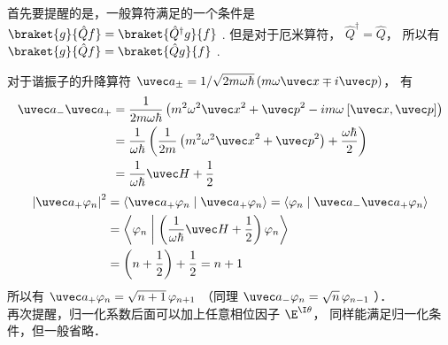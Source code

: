 
首先要提醒的是，一般算符满足的一个条件是 $\braket{g}{\hat Q f}=\braket{\hat Q^\dagger g}{ f}$ . 但是对于厄米算符， ${\hat Q^\dagger } = \hat Q$，  所以有 $\braket{g}{\hat Q f} = \braket{\hat Q g}{f}$ .

对于谐振子的升降算符 ${\uvec a_ \pm } = {1}/{{\sqrt {2m\omega \hbar } }}\left( {m\omega \uvec x \mp i\uvec p} \right)$， 有
\begin{equation}\begin{aligned}
{\uvec a_ - }{\uvec a_ + } &= \frac{1}{{2m\omega \hbar }}\left( {{m^2}{\omega ^2}{{\uvec x}^2} + {{\uvec p}^2} - im\omega {\kern 1pt} {\kern 1pt} [\uvec x,\uvec p]} \right) \\
&= \frac{1}{{\omega \hbar }}\left( {\frac{1}{{2m}}\left( {{m^2}{\omega ^2}{{\uvec x}^2} + {{\uvec p}^2}} \right) + \frac{{\omega \hbar }}{2}} \right) \\
&= \frac{1}{{\omega \hbar }}\uvec H + \frac{1}{2}
\end{aligned}\end{equation}
\begin{equation}\begin{aligned}
{\left| {{{\uvec a}_ + }{\varphi _n}} \right|^2} &= \left\langle {{{{\uvec a}_ + }{\varphi _n}}}
\mathrel{\left | {\vphantom {{{{\uvec a}_ + }{\varphi _n}} {{{\uvec a}_ + }{\varphi _n}}}}
\right. \kern-\nulldelimiterspace}
{{{{\uvec a}_ + }{\varphi _n}}} \right\rangle = \left\langle {{{\varphi _n}}}
\mathrel{\left | {\vphantom {{{\varphi _n}} {{{\uvec a}_ - }{{\uvec a}_ + }{\varphi _n}}}}
\right. \kern-\nulldelimiterspace}
{{{{\uvec a}_ - }{{\uvec a}_ + }{\varphi _n}}} \right\rangle  \\
&= \left\langle {{{\varphi _n}}}
\mathrel{\left | {\vphantom {{{\varphi _n}} {\left( {\frac{1}{{\omega \hbar }}\uvec H + \frac{1}{2}} \right){\varphi _n}}}}
\right. \kern-\nulldelimiterspace}
{{\left( {\frac{1}{{\omega \hbar }}\uvec H + \frac{1}{2}} \right){\varphi _n}}} \right\rangle \\
&= \left( {n + \frac{1}{2}} \right) + \frac{1}{2} = n + 1
\end{aligned}\end{equation}
所以有 ${\uvec a_ + }{\varphi _n} = \sqrt {n + 1}\, {\varphi _{n + 1}}$ （同理 ${\uvec a_ - }{\varphi _n} = \sqrt n \,{\varphi _{n - 1}}$ ）．\\
再次提醒，归一化系数后面可以加上任意相位因子 ${\E^{\I\theta }}$， 同样能满足归一化条件，但一般省略．